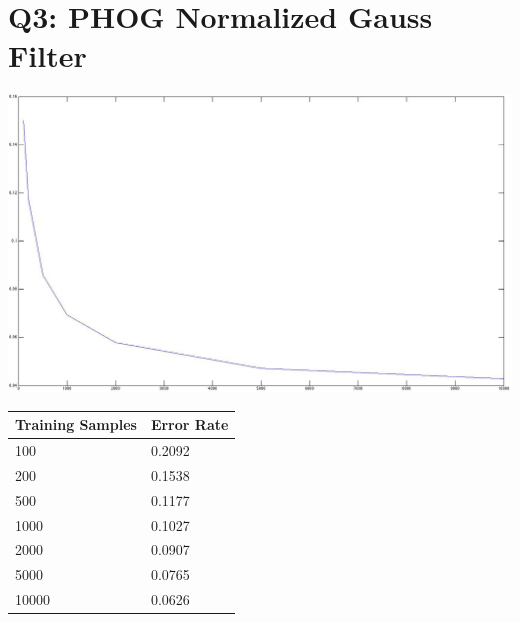 \documentclass[12pt]{article}
\begin{document}
\newpage
\section*{Q3: PHOG Normalized Gauss Filter}
  \includegraphics[scale=0.3]{q3_normalized_gauss.jpg}
  \begin{tabular}{l|l}
    \hline
    Training Samples & Error Rate \\
    \hline
    100   & 0.2092 \\
    200   & 0.1538 \\
    500   & 0.1177 \\
    1000  & 0.1027 \\
    2000  & 0.0907 \\
    5000  & 0.0765 \\
    10000 & 0.0626 \\
  \end{tabular}
\end{document}
